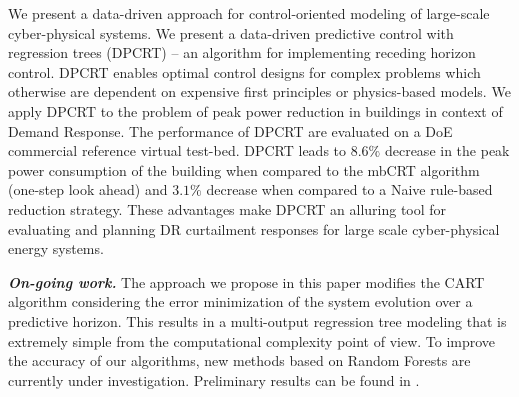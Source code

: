 We present a data-driven approach for control-oriented modeling of large-scale cyber-physical systems. 
We present a data-driven predictive control with regression trees (DPCRT) -- an algorithm for implementing receding horizon control. 
DPCRT enables optimal control designs for complex problems which otherwise are dependent on expensive first principles or physics-based models. 
We apply DPCRT to the problem of peak power reduction in buildings in context of Demand Response. 
The performance of DPCRT are evaluated on a DoE commercial reference virtual test-bed. 
DPCRT leads to $8.6\%$ decrease in the peak power consumption of the building when compared to the mbCRT algorithm (one-step look ahead) and $3.1\%$ decrease when compared to a Naive rule-based reduction strategy. 
These advantages make DPCRT an alluring tool for evaluating and planning DR curtailment responses for large scale cyber-physical energy systems.

\textbf{\emph{On-going work.}} The approach we propose in this paper modifies the CART algorithm considering the error minimization of the system evolution over a predictive horizon. 
This results in a multi-output regression tree modeling that is extremely simple from the computational complexity point of view. 
To improve the accuracy of our algorithms, new methods based on Random Forests are currently under investigation. Preliminary results can be found in \cite{JainACC2017,JainCDC2017}.
